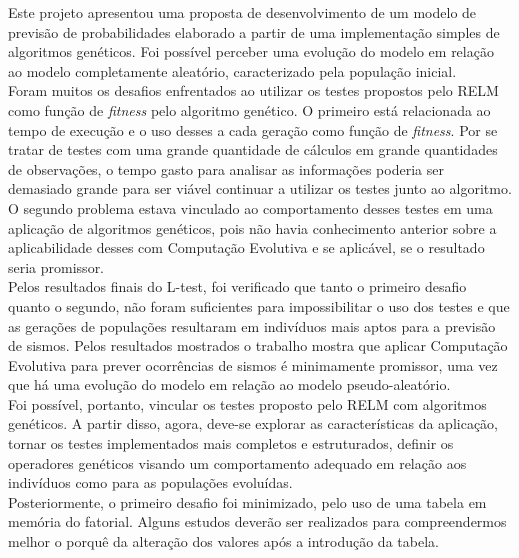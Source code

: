 Este projeto apresentou uma proposta de desenvolvimento de um modelo de previsão de probabilidades elaborado a partir de uma implementação simples de algoritmos genéticos. Foi possível perceber uma evolução do modelo em relação ao modelo completamente aleatório, caracterizado pela população inicial.\\

Foram muitos os desafios enfrentados ao utilizar os testes propostos pelo RELM como função de {\it fitness} pelo algoritmo genético. O primeiro está relacionada ao tempo de execução e o uso desses a cada geração como função de {\it fitness}. Por se tratar de testes com uma grande quantidade de cálculos em grande quantidades de observações, o tempo gasto para analisar as informações poderia ser demasiado grande para ser viável continuar a utilizar os testes junto ao algoritmo. O segundo problema estava vinculado ao comportamento desses testes em uma aplicação de algoritmos genéticos, pois não havia conhecimento anterior sobre a aplicabilidade desses com Computação Evolutiva e se aplicável, se o resultado seria promissor.\\

Pelos resultados finais do L-test, foi verificado que tanto o primeiro desafio quanto o segundo, não foram suficientes para impossibilitar o uso dos testes e que as gerações de populações resultaram em indivíduos mais aptos para a previsão de sismos. Pelos resultados mostrados o trabalho mostra que aplicar Computação Evolutiva para prever ocorrências de sismos é minimamente promissor, uma vez que há uma evolução do modelo em relação ao modelo pseudo-aleatório.\\

Foi possível, portanto, vincular os testes proposto pelo RELM com algoritmos genéticos. A partir disso, agora, deve-se explorar as características da aplicação, tornar os testes implementados mais completos e estruturados, definir os operadores genéticos visando um comportamento adequado em relação aos indivíduos como para as populações evoluídas.\\

Posteriormente, o primeiro desafio foi minimizado, pelo uso de uma tabela em memória do fatorial. Alguns estudos deverão ser realizados para compreendermos melhor o porquê da alteração dos valores após a introdução da tabela.\\

